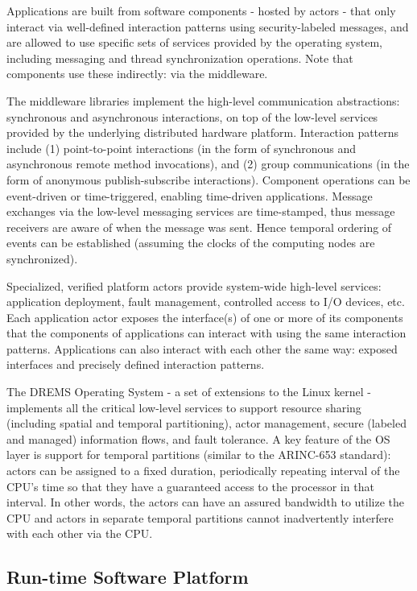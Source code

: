 Applications are built from software components - hosted by actors -
that only  interact via  well-defined interaction patterns using
security-labeled messages, and are allowed to use specific sets of
services provided by the operating system, including messaging and 
thread synchronization operations. Note that components use these 
indirectly: via the middleware.

The middleware libraries implement the high-level communication
abstractions: synchronous and asynchronous interactions, on top of the
low-level services provided by the underlying distributed hardware
platform. Interaction patterns include (1) point-to-point interactions
(in the form of synchronous and asynchronous remote method
invocations), and (2) group communications (in the form of
anonymous publish-subscribe interactions). Component operations can
be event-driven or time-triggered, enabling time-driven
applications. Message exchanges via the low-level messaging services
are time-stamped, thus message receivers are aware of when the message
was sent. Hence temporal ordering of events can be established
(assuming the clocks of the computing nodes are synchronized).

Specialized, verified platform actors provide system-wide high-level
services: application deployment, fault management, controlled access
to I/O devices, etc. Each application actor exposes the interface(s)
of one or more of its components that the components of applications
can interact with using the same interaction patterns. Applications
can also interact with each other the same way: exposed interfaces and
precisely defined interaction patterns.

The DREMS Operating System - a set of extensions to the Linux kernel -
implements all the critical low-level services to support resource
sharing (including spatial and temporal partitioning), actor management,
secure (labeled and managed) information flows, and fault tolerance. A
key feature of the OS layer is support for temporal partitions
(similar to the ARINC-653 standard): actors can be assigned to a
fixed duration, periodically repeating interval of the CPU's time so
that they have a guaranteed access to the processor in that
interval. In other words, the actors can have an assured bandwidth to
utilize the CPU and actors in separate temporal partitions cannot
inadvertently interfere with each other via the CPU.


\vspace{-0.04in}
\subsection{Run-time Software Platform}

